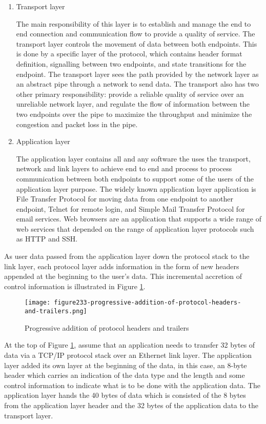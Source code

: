 \begin{enumerate}
\item Transport layer

The main responsibility of this layer is to establish and manage the end to end connection and communication flow to provide a quality of service. The transport layer controls the movement of data between both endpoints. This is done by a specific layer of the protocol, which contains header format definition, signalling between two endpoints, and state transitions for the endpoint. The transport layer sees the path provided by the network layer as an abstract pipe through a network to send data. The transport also has two other primary responsibility: provide a reliable quality of service over an unreliable network layer, and regulate the flow of information between the two endpoints over the pipe to maximize the throughput and minimize the congestion and packet loss in the pipe.

\item Application layer

The application layer contains all and any software the uses the transport, network and link layers to achieve end to end and process to process communication between both endpoints to support some of the users of the application layer purpose. The widely known application layer application is File Transfer Protocol for moving data from one endpoint to another endpoint, Telnet for remote login, and Simple Mail Transfer Protocol for email services. Web browsers are an application that supports a wide range of web services that depended on the range of application layer protocols such as HTTP and SSH.
\end{enumerate}
As user data passed from the application layer down the protocol stack to the link layer, each protocol layer adds information in the form of new headers appended at the beginning to the user's data. This incremental accretion of control information is illustrated in Figure \ref{fig:fig233}.

\begin{figure}[h]
\centering
\texttt{[image: figure233-progressive-addition-of-protocol-headers-and-trailers.png]}
\caption{Progressive addition of protocol headers and trailers \protect\cite{KrzyzstofBook}}
\label{fig:fig233}
\end{figure}

At the top of Figure \ref{fig:fig233}, assume that an application needs to transfer 32 bytes of data via a TCP/IP protocol stack over an Ethernet link layer. The application layer added its own layer at the beginning of the data, in this case, an 8-byte header which carries an indication of the data type and the length and some control information to indicate what is to be done with the application data. The application layer hands the 40 bytes of data which is consisted of the 8 bytes from the application layer header and the 32 bytes of the application data to the transport layer.

